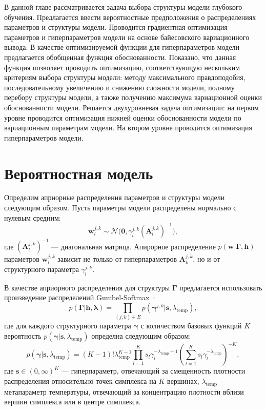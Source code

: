 В данной главе рассматривается задача выбора структуры модели глубокого обучения. Предлагается ввести вероятностные предположения о распределениях параметров и структуры модели. 
Проводится градиентная оптимизация параметров и гиперпараметров модели на основе байесовского вариационного вывода.  В качестве оптимизируемой функции для гиперпараметров модели предлагается обобщенная функция обоснованности. Показано, что данная функция позволяет проводить оптимизацию, соответствующую нескольким критериям выбора структуры модели: методу максимального правдоподобия, последовательному увеличению и снижению сложности модели, полному перебору структуры модели, а также получению максимума вариационной оценки обоснованности модели. Решается двухуровневая задача оптимизации: на первом уровне проводится оптимизация нижней оценки обоснованности модели по вариационным параметрам модели. На втором уровне проводится оптимизация гиперпараметров модели.

\section{Вероятностная модель}
Определим априорные распределения параметров и структуры модели следующим образом.
Пусть параметры модели распределены нормально с нулевым средним:
\[
    \mathbf{w}^{j,k}_l \sim \mathcal{N}\bigl(\mathbf{0}, \gamma^{j,k}_l(\mathbf{A}^{j,k}_l)^{-1}\bigr),
\]
где $ (\mathbf{A}^{j,k}_l)^{-1}$ --- диагональная матрица. Апирорное распределение $p(\mathbf{w}|\boldsymbol{\Gamma}, \mathbf{h})$ параметров $\mathbf{w}^{j,k}_l$ зависит не только от гиперпараметров $\mathbf{A}_k^{j,k}$, но и от структурного параметра $\gamma^{j,k}_l$.


В качестве априорного распределения для структуры $\boldsymbol{\Gamma}$ предлагается использовать произведение распределений Gumbel-Softmax~\cite{gs}:
\[
    p(\boldsymbol{\Gamma}|\mathbf{h},\boldsymbol{\lambda}) = \prod_{(j,k) \in E} p(\boldsymbol{\gamma}^{j,k}|\mathbf{s}, \lambda_\text{temp}),
\]
где для каждого структурного параметра $\boldsymbol{\gamma}$ с количеством базовых функций $K$ вероятность $p(\boldsymbol{\gamma}|\mathbf{s}, \lambda_\text{temp})$ определна следующим образом:
\[
    p(\boldsymbol{\gamma}|\mathbf{s}, \lambda_\text{temp}) = (K-1)!\lambda_{\text{temp}}^{K-1}\prod_{l=1}^K s_l\gamma_l^{-\lambda_\text{temp} -1} \left(\sum_{l=1}^K s_l\gamma_l^{-\lambda_\text{temp}}\right)^{-K},
\]
где $\mathbf{s} \in (0,\infty)^K$ --- гиперпараметр, отвечающий за смещенность плотности распределения относительно точек симплекса на $K$ вершинах, $\lambda_{\text{temp}}$ --- метапараметр температуры, отвечающий за концентрацию плотности вблизи вершин симплекса или в центре симплекса.


